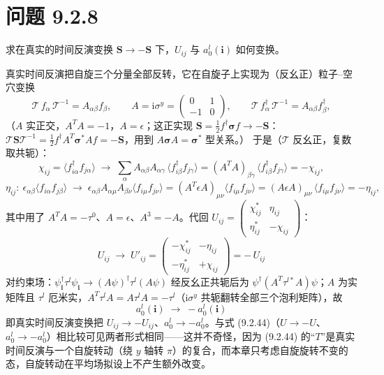 \section*{问题 9.2.8}
\begin{problem}
求在真实的时间反演变换 $\pmb{S}\to-\pmb{S}$ 下，$U_{ij}$ 与 $a_0^l(\pmb{i})$ 如何变换。
\end{problem}
\solution
真实时间反演把自旋三个分量全部反转，它在自旋子上实现为（反幺正）粒子--空穴变换
\begin{equation*}
\mathcal{T}\,f_{\alpha}\,\mathcal{T}^{-1}=A_{\alpha\beta}f_{\beta},\qquad
A=\mathrm{i}\sigma^{y}=\begin{pmatrix}0&1\\-1&0\end{pmatrix},\qquad
\mathcal{T}\,f^{\dagger}_{\alpha}\,\mathcal{T}^{-1}=A_{\alpha\beta}f^{\dagger}_{\beta} ,
\end{equation*}
（$A$ 实正交，$A^{T}A=-1$，$A=\epsilon$；这正实现 $\pmb{S}=\frac12 f^{\dagger}\pmb{\sigma}f\to-\pmb{S}$：$\mathcal{T}\pmb{S}\mathcal{T}^{-1}=\frac12 f^{\dagger}A^{T}\pmb{\sigma}^{*}Af=-\pmb{S}$，用到 $A\pmb{\sigma}A=\pmb{\sigma}^{*}$ 型关系。）
于是（$\mathcal{T}$ 反幺正，复数取共轭）：
\begin{equation*}
\chi_{ij}=\langle f^{\dagger}_{i\alpha}f_{j\alpha}\rangle
\;\longrightarrow\;\sum_{\alpha}A_{\alpha\beta}A_{\alpha\gamma}\,\langle f^{\dagger}_{i\beta}f_{j\gamma}\rangle
=(A^{T}A)_{\beta\gamma}\,\langle f^{\dagger}_{i\beta}f_{j\gamma}\rangle=-\chi_{ij} ,
\end{equation*}
\begin{equation*}
\eta_{ij}:\ \epsilon_{\alpha\beta}\langle f_{i\alpha}f_{j\beta}\rangle
\;\longrightarrow\;\epsilon_{\alpha\beta}A_{\alpha\mu}A_{\beta\nu}\langle f_{i\mu}f_{j\nu}\rangle
=(A^{T}\epsilon A)_{\mu\nu}\langle f_{i\mu}f_{j\nu}\rangle
=(A\epsilon A)_{\mu\nu}\,\langle f_{i\mu}f_{j\nu}\rangle=-\eta_{ij} ,
\end{equation*}
其中用了 $A^{T}A=-\tau^0$、$A=\epsilon$、$A^3=-A$。代回 $U_{ij}=\begin{pmatrix}\chi^*_{ij}&\eta_{ij}\\ \eta^*_{ij}&-\chi_{ij}\end{pmatrix}$：
\begin{equation*}
\boxed{\;U_{ij}\;\longrightarrow\;U'_{ij}=\begin{pmatrix}-\chi^*_{ij}&-\eta_{ij}\\ -\eta^*_{ij}&+\chi_{ij}\end{pmatrix}=-\,U_{ij}\;}
\end{equation*}
对约束场：$\psi^{\dagger}_{\pmb{i}}\tau^l\psi_{\pmb{i}}\to(A\psi)^{\dagger}\tau^l(A\psi)$ 经反幺正共轭后为 $\psi^{\dagger}(A^{T}\tau^{l*}A)\psi$；$A$ 为实矩阵且 $\tau^l$ 厄米实，$A^{T}\tau^lA=A\tau^lA=-\tau^l$（$\mathrm{i}\sigma^y$ 共轭翻转全部三个泡利矩阵），故
\begin{equation*}
\boxed{\;a_0^{l}(\pmb{i})\;\longrightarrow\;-a_0^{l}(\pmb{i})\;}
\end{equation*}
即真实时间反演变换把 $U_{ij}\to-U_{ij}$、$a_0^l\to-a_0^l$。与式 (9.2.44)（$U\to-U$、$a_0^l\to-a_0^l$）相比较可见两者形式相同——这并不奇怪，因为 (9.2.44) 的“$T$”是真实时间反演与一个自旋转动（绕 $y$ 轴转 $\pi$）的复合，而本章只考虑自旋旋转不变的态，自旋转动在平均场拟设上不产生额外改变。

